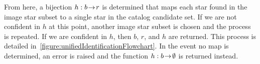 From here, a bijection $h : b \! \rightarrow \! r$ is determined that maps each star found in the image star subset to a
single star in the catalog candidate set.
If we are not confident in $h$ at this point, another image star subset is chosen and the process is repeated.
If we are confident in $h$, then $b$, $r$, and $h$ are returned.
This process is detailed in~\autoref{figure:unifiedIdentificationFlowchart}.
In the event no map is determined, an error is raised and the function $h : b \! \rightarrow \! \emptyset$ is returned
instead.


